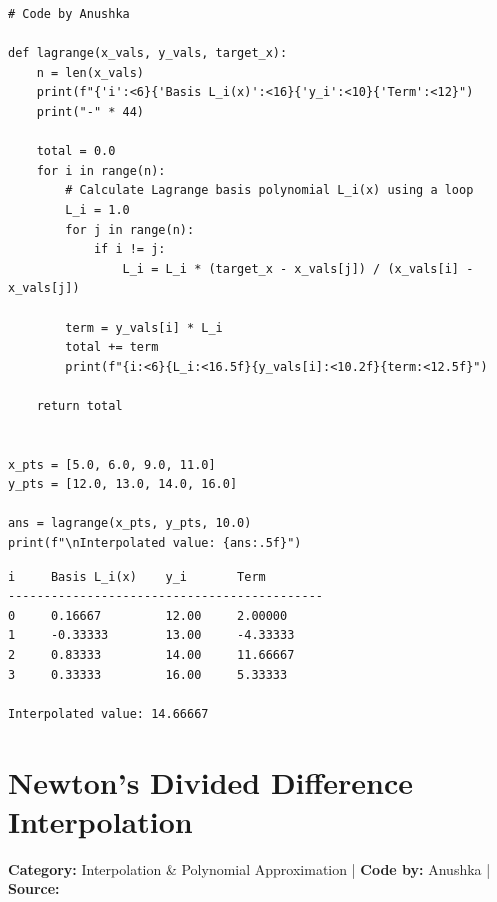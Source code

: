 \documentclass[10pt,a4paper]{report}
\begin{document}
\begin{tcolorbox}[colback=codebg,colframe=secondary,title=\textbf{Python Implementation (Step-by-Step Loops \& Pure Functions)},boxrule=1pt,arc=2mm]
\begin{lstlisting}[style=python_detailed]
# Code by Anushka

def lagrange(x_vals, y_vals, target_x):
    n = len(x_vals)
    print(f"{'i':<6}{'Basis L_i(x)':<16}{'y_i':<10}{'Term':<12}")
    print("-" * 44)

    total = 0.0
    for i in range(n):
        # Calculate Lagrange basis polynomial L_i(x) using a loop
        L_i = 1.0
        for j in range(n):
            if i != j:
                L_i = L_i * (target_x - x_vals[j]) / (x_vals[i] - x_vals[j])

        term = y_vals[i] * L_i
        total += term
        print(f"{i:<6}{L_i:<16.5f}{y_vals[i]:<10.2f}{term:<12.5f}")

    return total


x_pts = [5.0, 6.0, 9.0, 11.0]
y_pts = [12.0, 13.0, 14.0, 16.0]

ans = lagrange(x_pts, y_pts, 10.0)
print(f"\nInterpolated value: {ans:.5f}")

\end{lstlisting}
\end{tcolorbox}

\begin{tcolorbox}[colback=termbg,colframe=primary,title=\textbf{Program Execution Output \& Convergence Table},boxrule=1pt,arc=2mm]
\begin{lstlisting}[style=terminal_output]
i     Basis L_i(x)    y_i       Term        
--------------------------------------------
0     0.16667         12.00     2.00000     
1     -0.33333        13.00     -4.33333    
2     0.83333         14.00     11.66667    
3     0.33333         16.00     5.33333     

Interpolated value: 14.66667
\end{lstlisting}
\end{tcolorbox}

\newpage

\section{Newton's Divided Difference Interpolation}
\textbf{Category:} \textcolor{secondary}{Interpolation \& Polynomial Approximation} \quad | \quad \textbf{Code by:} \textcolor{secondary}{Anushka} \quad | \quad \textbf{Source:} \texttt{}
\end{document}
